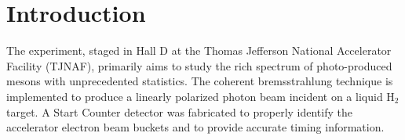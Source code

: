 \section{Introduction}

The \gx{} experiment, staged in Hall D at the Thomas Jefferson National Accelerator Facility (TJNAF), primarily aims to study the rich spectrum of photo-produced mesons with unprecedented statistics.  The coherent bremsstrahlung technique is implemented to produce a linearly polarized photon beam incident on a liquid $\mathrm{H_{2}}$ target. A Start Counter detector was fabricated to properly identify the accelerator electron beam buckets and to provide accurate timing information.